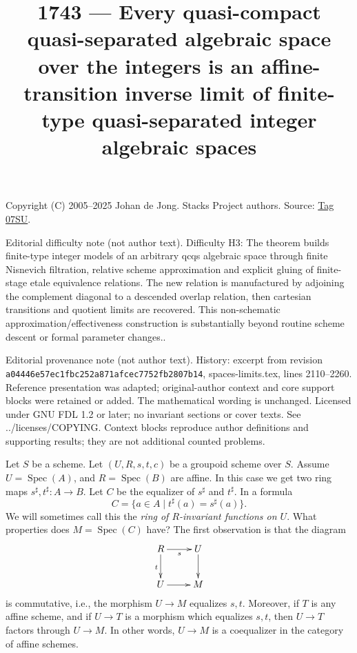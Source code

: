 \documentclass{amsart}
\theoremstyle{plain}
\theoremstyle{definition}
\theoremstyle{remark}
\numberwithin{equation}{subsection}
\def\Spec{\mathop{\mathrm{Spec}}}
\begin{document}
\title[Stacks Project, Tag 07SU]{1743 --- Every quasi-compact quasi-separated algebraic space over the integers is an affine-transition inverse limit of finite-type quasi-separated integer algebraic spaces}
\maketitle
\noindent Copyright (C) 2005--2025 Johan de Jong. Stacks Project authors. Source: \href{https://stacks.math.columbia.edu/tag/07SU}{Tag 07SU}.

\noindent Editorial difficulty note (not author text). Difficulty H3: The theorem builds finite-type integer models of an arbitrary qcqs algebraic space through finite Nisnevich filtration, relative scheme approximation and explicit gluing of finite-stage etale equivalence relations. The new relation is manufactured by adjoining the complement diagonal to a descended overlap relation, then cartesian transitions and quotient limits are recovered. This non-schematic approximation/effectiveness construction is substantially beyond routine scheme descent or formal parameter changes..

\noindent Editorial provenance note (not author text). History: excerpt from revision \texttt{a0444\allowbreak 6e57e\allowbreak c1fbc\allowbreak 252a8\allowbreak 71afc\allowbreak ec775\allowbreak 2fb28\allowbreak 07b14}, spaces-limits.tex, lines 2110--2260. Reference presentation was adapted; original-author context and core support blocks were retained or added. The mathematical wording is unchanged. Licensed under GNU FDL 1.2 or later; no invariant sections or cover texts. See ../licenses/COPYING. Context blocks reproduce author definitions and supporting results; they are not additional counted problems.

\noindent
Let $S$ be a scheme.
Let $(U, R, s, t, c)$ be a groupoid scheme over $S$.
Assume $U = \Spec(A)$, and $R = \Spec(B)$ are affine.
In this case we get two ring maps
$s^\sharp, t^\sharp : A \longrightarrow B$.
Let $C$ be the equalizer of $s^\sharp$ and $t^\sharp$. In a formula
\begin{equation}
\label{groupoids-equation-invariants}
C = \{a \in A \mid t^\sharp(a) = s^\sharp(a) \}.
\end{equation}
We will sometimes call this the {\it ring of $R$-invariant functions on $U$}.
What properties does $M = \Spec(C)$ have? The first observation is
that the diagram
$$
\xymatrix{
R \ar[r]_s \ar[d]_t & U \ar[d] \\
U \ar[r] & M
}
$$
is commutative, i.e., the morphism $U \to M$ equalizes $s, t$.
Moreover, if $T$ is any affine scheme, and if $U \to T$ is
a morphism which equalizes $s, t$, then $U \to T$ factors through $U \to M$.
In other words, $U \to M$ is a coequalizer in the category of affine schemes.
\end{document}
